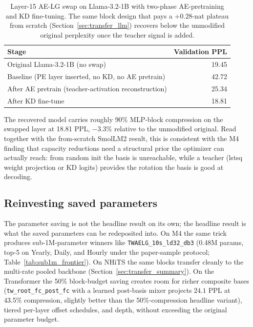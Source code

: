 \documentclass{article}
\begin{document}
\begin{table}[h]
  \caption{Layer-15 AE-LG swap on Llama-3.2-1B with two-phase AE-pretraining and KD fine-tuning. The same block design that pays a $+0.28$-nat plateau from scratch (Section~\ref{sec:transfer_llm}) recovers below the unmodified original perplexity once the teacher signal is added.}
  \label{tab:llm_kd}
  \centering
  \begin{tabular}{lr}
    \toprule
    Stage & Validation PPL \\
    \midrule
    Original Llama-3.2-1B (no swap)                 & 19.45 \\
    Baseline (PE layer inserted, no KD, no AE pretrain) & 42.72 \\
    After AE pretrain (teacher-activation reconstruction) & 25.34 \\
    After KD fine-tune                              & 18.81 \\
    \bottomrule
  \end{tabular}
\end{table}

The recovered model carries roughly 90\% MLP-block compression on the swapped layer at 18.81 PPL, $-3.3\%$ relative to the unmodified original. Read together with the from-scratch SmolLM2 result, this is consistent with the M4 finding that capacity reductions need a structural prior the optimizer can actually reach: from random init the basis is unreachable, while a teacher (lstsq weight projection or KD logits) provides the rotation the basis is good at decoding.

\subsection{Reinvesting saved parameters}

The parameter saving is not the headline result on its own; the headline result is what the saved parameters can be redeposited into. On M4 the same trick produces sub-1M-parameter winners like \texttt{TWAELG\_10s\_ld32\_db3} (0.48M params, top-5 on Yearly, Daily, and Hourly under the paper-sample protocol; Table~\ref{tab:sub1m_frontier}). On NHiTS the same blocks transfer cleanly to the multi-rate pooled backbone (Section~\ref{sec:transfer_summary}). On the Transformer the 50\% block-budget saving creates room for richer composite bases (\texttt{tw\_root\_fc\_post\_fc} with a learned post-basis mixer projects $24.1$ PPL at 43.5\% compression, slightly better than the 50\%-compression headline variant), tiered per-layer offset schedules, and depth, without exceeding the original parameter budget.
\end{document}
